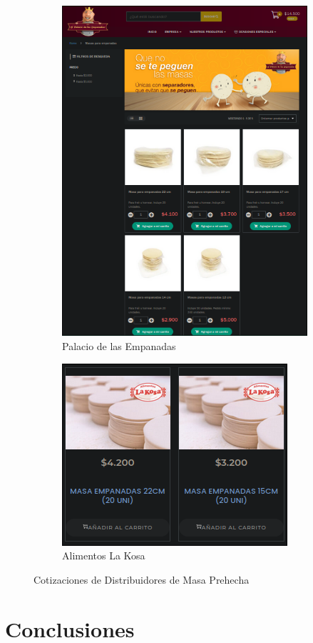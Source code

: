 \documentclass[12pt]{article}
\begin{document}
\begin{figure}[h]
    \begin{subfigure}{0.5\textwidth}
        \centering
        \includegraphics[width=0.95\linewidth]{palacio} %
        \caption{Palacio de las Empanadas}
        \label{fig:palacio}
        
    \end{subfigure}
    \begin{subfigure}{0.5\textwidth}
        \centering
        \includegraphics[width=0.95\linewidth]{kosa} %
        \caption{Alimentos La Kosa}
        \label{fig:kosa}
    \end{subfigure}
    \caption{Cotizaciones de Distribuidores de Masa Prehecha}
    \label{fig:cotizaciones_masas}
\end{figure}
\newpage



\section{Conclusiones} %
\end{document}
